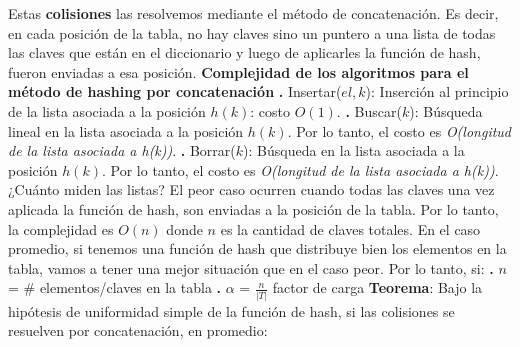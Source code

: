 \documentclass[10pt,a4paper]{article}
\begin{document}
Estas \textbf{colisiones} las resolvemos mediante el método de concatenación. Es decir, en cada posición de la tabla, no hay claves sino un puntero a una lista de todas las claves que están en el diccionario y luego de aplicarles la función de hash, fueron enviadas a esa posición.
\newline
\newline
\textbf{Complejidad de los algoritmos para el método de hashing por concatenación}
\newline
\newline
\textbf{.} Insertar($el,k$): Inserción al principio de la lista asociada a la posición $h(k)$: costo $O(1)$.
\newline
\newline
\textbf{.} Buscar($k$): Búsqueda lineal en la lista asociada a la posición $h(k)$. Por lo tanto, el costo es \textit{O(longitud de la lista asociada a h(k))}.
\newline
\newline
\textbf{.} Borrar($k$): Búsqueda en la lista asociada a la posición $h(k)$. Por lo tanto, el costo es \textit{O(longitud de la lista asociada a h(k))}.
\newline
\newline
¿Cuánto miden las listas?
\newline
\newline
El peor caso ocurren cuando todas las claves una vez aplicada la función de hash, son enviadas a la posición de la tabla. Por lo tanto, la complejidad es $O(n)$ donde $n$ es la cantidad de claves totales. 
\newline
\newline
En el caso promedio, si tenemos una función de hash que distribuye bien los elementos en la tabla, vamos a tener una mejor situación que en el caso peor. 
\newline
\newline
Por lo tanto, si:
\newline
\newline
\textbf{.} $n$ = \# elementos/claves en la tabla 
\newline
\newline
\textbf{.} $\alpha$ = $\displaystyle \frac{n}{|T|}$ factor de carga
\newline
\newline
\newline
\textbf{Teorema}: Bajo la hipótesis de uniformidad simple de la función de hash, si las colisiones se resuelven por concatenación, en promedio:
\newline
\end{document}
